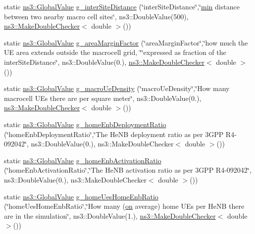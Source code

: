 \begin{DoxyCompactItemize}
\item 
static \hyperlink{classns3_1_1GlobalValue}{ns3\+::\+Global\+Value} \hyperlink{lena-dual-stripe_8cc_af3c89e09ec8aca3580170d72dda6b7cb}{g\+\_\+inter\+Site\+Distance} (\char`\"{}inter\+Site\+Distance\char`\"{},\char`\"{}\hyperlink{80211b_8c_ac6afabdc09a49a433ee19d8a9486056d}{min} distance between two nearby macro cell sites\char`\"{}, ns3\+::\+Double\+Value(500), \hyperlink{namespacens3_a0f8000e7b66dd988358648f0b16c7709}{ns3\+::\+Make\+Double\+Checker}$<$ double $>$())
\item 
static \hyperlink{classns3_1_1GlobalValue}{ns3\+::\+Global\+Value} \hyperlink{lena-dual-stripe_8cc_af8bc4d58fc45859c4cc5d46056918f8a}{g\+\_\+area\+Margin\+Factor} (\char`\"{}area\+Margin\+Factor\char`\"{},\char`\"{}how much the UE area extends outside the macrocell grid, \char`\"{}\char`\"{}expressed as fraction of the inter\+Site\+Distance\char`\"{}, ns3\+::\+Double\+Value(0.), \hyperlink{namespacens3_a0f8000e7b66dd988358648f0b16c7709}{ns3\+::\+Make\+Double\+Checker}$<$ double $>$())
\item 
static \hyperlink{classns3_1_1GlobalValue}{ns3\+::\+Global\+Value} \hyperlink{lena-dual-stripe_8cc_aa657d06b814d04e5cf6092d1a962ae07}{g\+\_\+macro\+Ue\+Density} (\char`\"{}macro\+Ue\+Density\char`\"{},\char`\"{}How many macrocell U\+Es there are per square meter\char`\"{}, ns3\+::\+Double\+Value(0.), \hyperlink{namespacens3_a0f8000e7b66dd988358648f0b16c7709}{ns3\+::\+Make\+Double\+Checker}$<$ double $>$())
\item 
static \hyperlink{classns3_1_1GlobalValue}{ns3\+::\+Global\+Value} \hyperlink{lena-dual-stripe_8cc_a3882599d6730a3f262a4ba0ba6913192}{g\+\_\+home\+Enb\+Deployment\+Ratio} (\char`\"{}home\+Enb\+Deployment\+Ratio\char`\"{},\char`\"{}The He\+NB deployment ratio as per 3\+G\+P\+P R4-\/092042\char`\"{}, ns3\+::\+Double\+Value(0.), ns3\+::\+Make\+Double\+Checker$<$ double $>$())
\item 
static \hyperlink{classns3_1_1GlobalValue}{ns3\+::\+Global\+Value} \hyperlink{lena-dual-stripe_8cc_aa422cb0fc368952f6203db9f26fc7f0c}{g\+\_\+home\+Enb\+Activation\+Ratio} (\char`\"{}home\+Enb\+Activation\+Ratio\char`\"{},\char`\"{}The He\+NB activation ratio as per 3\+G\+P\+P R4-\/092042\char`\"{}, ns3\+::\+Double\+Value(0.), ns3\+::\+Make\+Double\+Checker$<$ double $>$())
\item 
static \hyperlink{classns3_1_1GlobalValue}{ns3\+::\+Global\+Value} \hyperlink{lena-dual-stripe_8cc_ae1c75341a2e656e0a04c131a12dad30d}{g\+\_\+home\+Ues\+Home\+Enb\+Ratio} (\char`\"{}home\+Ues\+Home\+Enb\+Ratio\char`\"{},\char`\"{}How many (\hyperlink{lte__link__budget__x2__handover__measures_8m_ac88aa5a5c67076097e4a0e87a0709ea0}{on} average) home U\+Es per He\+NB there are in the simulation\char`\"{}, ns3\+::\+Double\+Value(1.), \hyperlink{namespacens3_a0f8000e7b66dd988358648f0b16c7709}{ns3\+::\+Make\+Double\+Checker}$<$ double $>$())

\end{DoxyCompactItemize}
